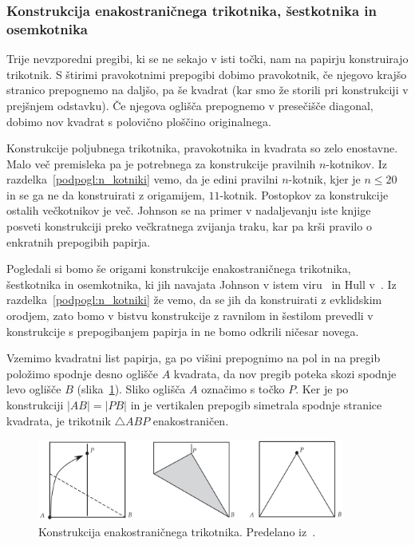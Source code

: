 \subsubsection*{Konstrukcija enakostraničnega trikotnika, šestkotnika in osemkotnika}

Trije nevzporedni pregibi, ki se ne sekajo v isti točki, nam na papirju konstruirajo trikotnik. S štirimi pravokotnimi prepogibi dobimo pravokotnik, če njegovo krajšo stranico prepognemo na daljšo, pa še kvadrat (kar smo že storili pri konstrukciji v prejšnjem odstavku). Če njegova oglišča prepognemo v presečišče diagonal, dobimo nov kvadrat s polovično ploščino originalnega.

Konstrukcije poljubnega trikotnika, pravokotnika in kvadrata so zelo enostavne. Malo več premisleka pa je potrebnega za konstrukcije pravilnih $n$-kotnikov. Iz razdelka~\ref{podpogl:n_kotniki} vemo, da je edini pravilni $n$-kotnik, kjer je $n \leq 20$ in se ga ne da konstruirati z origamijem, $11$-kotnik. Postopkov za konstrukcije ostalih večkotnikov je več. Johnson se na primer v nadaljevanju iste knjige posveti konstrukciji preko večkratnega zvijanja traku, kar pa krši pravilo o enkratnih prepogibih papirja.

Pogledali si bomo še origami konstrukcije enakostraničnega trikotnika, šestkotnika in osemkotnika, ki jih navajata Johnson v istem viru~\cite[str.\ 14--15]{johnson1957} in Hull v~\cite[str.\ 1--12]{hull2013}. Iz razdelka~\ref{podpogl:n_kotniki} že vemo, da se jih da konstruirati z evklidskim orodjem, zato bomo v bistvu konstrukcije z ravnilom in šestilom prevedli v konstrukcije s prepogibanjem papirja in ne bomo odkrili ničesar novega.

Vzemimo kvadratni list papirja, ga po višini prepognimo na pol in na pregib položimo spodnje desno oglišče $A$ kvadrata, da nov pregib poteka skozi spodnje levo oglišče $B$ (slika~\ref{fig:trik_enak_basic}). Sliko oglišča $A$ označimo s točko $P$. Ker je po konstrukciji $|AB| = |PB|$ in je vertikalen prepogib simetrala spodnje stranice kvadrata, je trikotnik $\triangle ABP$ enakostraničen.

\begin{figure}[h]
    \centering
    \includegraphics[width=0.9\textwidth]{images/n-kotniki/trik_enak_basic.png}
    \caption[Konstrukcija enakostraničnega trikotnika (način $1$)]{Konstrukcija enakostraničnega trikotnika. Predelano iz~\cite[str. 9]{hull2013}.}
    \label{fig:trik_enak_basic}
\end{figure}

